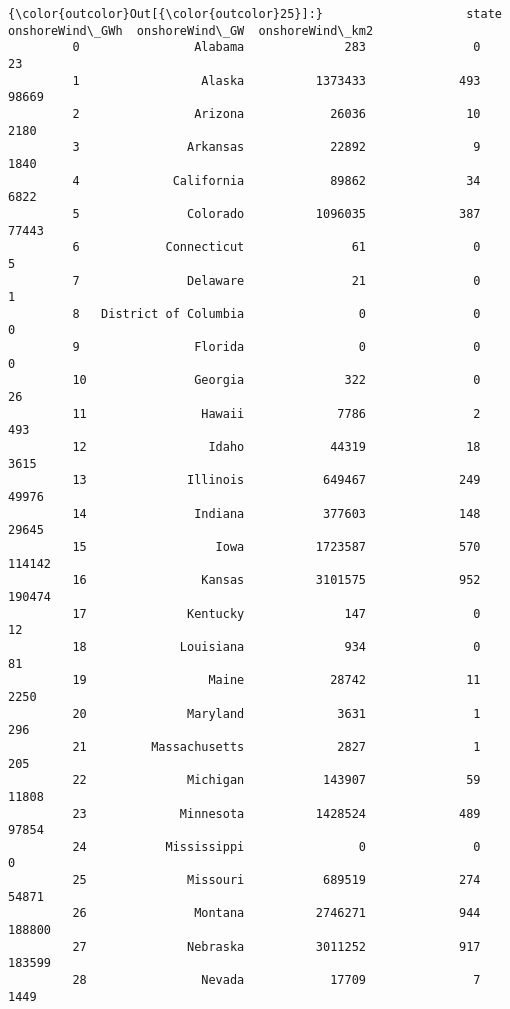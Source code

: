 \documentclass[11pt]{article}
\begin{document}
\begin{Verbatim}[commandchars=\\\{\}]
{\color{outcolor}Out[{\color{outcolor}25}]:}                    state  onshoreWind\_GWh  onshoreWind\_GW  onshoreWind\_km2
         0                Alabama              283               0               23
         1                 Alaska          1373433             493            98669
         2                Arizona            26036              10             2180
         3               Arkansas            22892               9             1840
         4             California            89862              34             6822
         5               Colorado          1096035             387            77443
         6            Connecticut               61               0                5
         7               Delaware               21               0                1
         8   District of Columbia                0               0                0
         9                Florida                0               0                0
         10               Georgia              322               0               26
         11                Hawaii             7786               2              493
         12                 Idaho            44319              18             3615
         13              Illinois           649467             249            49976
         14               Indiana           377603             148            29645
         15                  Iowa          1723587             570           114142
         16                Kansas          3101575             952           190474
         17              Kentucky              147               0               12
         18             Louisiana              934               0               81
         19                 Maine            28742              11             2250
         20              Maryland             3631               1              296
         21         Massachusetts             2827               1              205
         22              Michigan           143907              59            11808
         23             Minnesota          1428524             489            97854
         24           Mississippi                0               0                0
         25              Missouri           689519             274            54871
         26               Montana          2746271             944           188800
         27              Nebraska          3011252             917           183599
         28                Nevada            17709               7             1449

\end{Verbatim}
\end{document}
